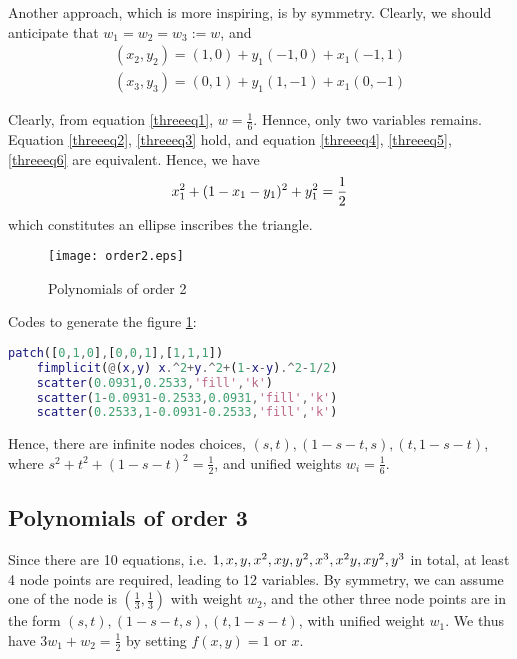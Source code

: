 \documentclass[conference,onecolumn, 12pt]{IEEEtran}
\begin{document}
Another approach, which is more inspiring, is by symmetry. Clearly, we should anticipate that $w_1=w_2=w_3:=w$, and
\begin{equation}
    \begin{split}
        (x_2,y_2)=(1,0)+y_1(-1,0)+x_1(-1,1)\\
        (x_3,y_3)=(0,1)+y_1(1,-1)+x_1(0,-1)    
    \end{split}
\end{equation}

Clearly, from equation \ref{threeeq1}, $w=\frac{1}{6}$. Hennce, only two variables remains. Equation \ref{threeeq2}, \ref{threeeq3} hold, and equation \ref{threeeq4}, \ref{threeeq5}, \ref{threeeq6} are equivalent. Hence, we have
\begin{equation}
        x_1^2+(1-x_1-y_1)^2+y_1^2 = \frac{1}{2}\\
\end{equation}
which constitutes an ellipse inscribes the triangle.

\begin{figure}[!htbp]
    \centering
    \texttt{[image: order2.eps]}
    \caption{Polynomials of order 2}
    \label{p2}
\end{figure}
Codes to generate the figure \ref{p2}:
\begin{lstlisting}[language=matlab]
    patch([0,1,0],[0,0,1],[1,1,1])
    fimplicit(@(x,y) x.^2+y.^2+(1-x-y).^2-1/2)
    scatter(0.0931,0.2533,'fill','k')
    scatter(1-0.0931-0.2533,0.0931,'fill','k')
    scatter(0.2533,1-0.0931-0.2533,'fill','k')
\end{lstlisting}

Hence, there are infinite nodes choices, $(s,t),(1-s-t,s),(t,1-s-t)$, where $s^2+t^2+(1-s-t)^2=\frac{1}{2}$, and unified weights $w_i=\frac{1}{6}$.



\subsection{Polynomials of order 3}
Since there are 10 equations, i.e. $1,x,y,x^2,xy,y^2,x^3,x^2y,\\xy^2,y^3$ in total, at least 4 node points are required, leading to 12 variables. By symmetry, we can assume one of the node is $(\frac{1}{3},\frac{1}{3})$ with weight $w_2$, and the other three node points are in the form $(s,t),(1-s-t,s),(t,1-s-t)$, with unified weight $w_1$. We thus have $3w_1+w_2=\frac{1}{2}$ by setting $f(x,y)=1$ or $x$.
\end{document}
